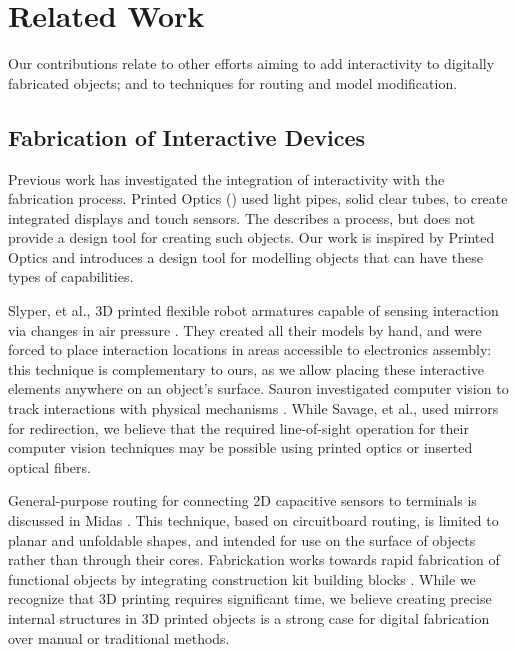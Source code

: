 \section{Related Work}
Our contributions relate to other efforts aiming to add interactivity to digitally fabricated objects; and to techniques for routing and model modification.  

\subsection{Fabrication of Interactive Devices}

Previous work has investigated the integration of interactivity with the fabrication process.  Printed Optics (\cite{Willis-printedoptics}) used light pipes, solid clear tubes, to create integrated displays and touch sensors. The describes a process, but does not provide a design tool for creating such objects. Our work is inspired by Printed Optics and introduces a design tool for modelling objects that can have these types of capabilities.  

Slyper, et al., 3D printed flexible robot armatures capable of sensing interaction via changes in air pressure \cite{Slyper-pressure}.  They created all their models by hand, and were forced to place interaction locations in areas accessible to electronics assembly: this technique is complementary to ours, as we allow placing these interactive elements anywhere on an object's surface. Sauron investigated computer vision to track interactions with physical mechanisms \cite{Savage-sauron}.  While Savage, et al., used mirrors for redirection, we believe that the required line-of-sight operation for their computer vision techniques may be possible using printed optics or inserted optical fibers.  

General-purpose routing for connecting 2D capacitive sensors to terminals is discussed in Midas \cite{Savage-midas}.  This technique, based on circuitboard routing, is limited to planar and unfoldable shapes, and intended for use on the surface of objects rather than through their cores.  Fabrickation works towards rapid fabrication of functional objects by integrating construction kit building blocks \cite{Mueller-fabrickation}.  While we recognize that 3D printing requires significant time, we believe creating precise internal structures in 3D printed objects is a strong case for digital fabrication over manual or traditional methods.


